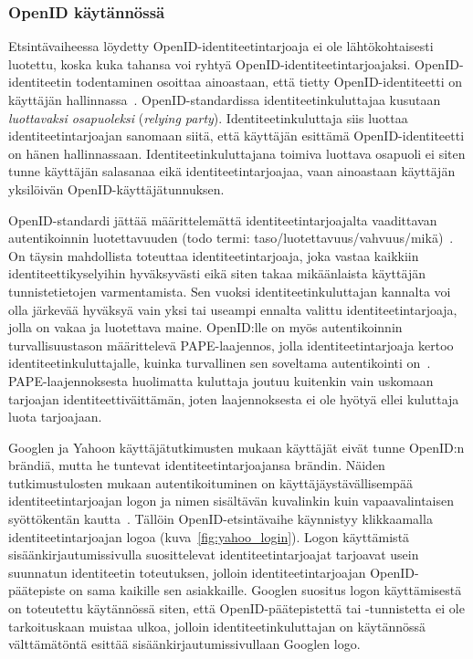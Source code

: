 \documentclass[finnish,gradu]{tktltiki}
\begin{document}
    \subsubsection{OpenID käytännössä} %
    \label{ssub:openid_käytännössä}

    Etsintävaiheessa löydetty OpenID-identiteetintarjoaja ei ole lähtökohtaisesti luotettu, koska kuka tahansa voi ryhtyä OpenID-identiteetintarjoajaksi. OpenID-identiteetin todentaminen osoittaa ainoastaan, että tietty OpenID-identiteetti on käyttäjän hallinnassa~\cite{openid_2.0_specification_07}. OpenID-standardissa identiteetinkuluttajaa kusutaan \emph{luottavaksi osapuoleksi} (\emph{relying party}). Identiteetinkuluttaja siis luottaa identiteetintarjoajan sanomaan siitä, että käyttäjän esittämä OpenID-identiteetti on hänen hallinnassaan. Identiteetinkuluttajana toimiva luottava osapuoli ei siten tunne käyttäjän salasanaa eikä identiteetintarjoajaa, vaan ainoastaan käyttäjän yksilöivän OpenID-käyttäjätunnuksen.

    OpenID-standardi jättää määrittelemättä identiteetintarjoajalta vaadittavan autentikoinnin luotettavuuden (todo termi: taso/luotettavuus/vahvuus/mikä)~\cite{openid_2.0_specification_07}. On täysin mahdollista toteuttaa identiteetintarjoaja, joka vastaa kaikkiin identiteettikyselyihin hyväksyvästi eikä siten takaa mikäänlaista käyttäjän tunnistetietojen varmentamista. Sen vuoksi identiteetinkuluttajan kannalta voi olla järkevää hyväksyä vain yksi tai useampi ennalta valittu identiteetintarjoaja, jolla on vakaa ja luotettava maine. OpenID:lle on myös autentikoinnin turvallisuustason määrittelevä PAPE-laajennos, jolla identiteetintarjoaja kertoo identiteetinkuluttajalle, kuinka turvallinen sen soveltama autentikointi on~\cite{openid_2.0_pape_07}. PAPE-laajennoksesta huolimatta kuluttaja joutuu kuitenkin vain uskomaan tarjoajan identiteettiväittämän, joten laajennoksesta ei ole hyötyä ellei kuluttaja luota tarjoajaan.

    Googlen ja Yahoon käyttäjätutkimusten mukaan käyttäjät eivät tunne OpenID:n brändiä, mutta he tuntevat identiteetintarjoajansa brändin. Näiden tutkimustulosten mukaan autentikoituminen on käyttäjäystävällisempää identiteetintarjoajan logon ja nimen sisältävän kuvalinkin kuin vapaavalintaisen syöttökentän kautta~\cite{google_usability_federated_login_2008, yahoo_usability_openid_2008, google_thoughts_combining_ux_2008}. Tällöin OpenID-etsintävaihe käynnistyy klikkaamalla identiteetintarjoajan logoa (kuva~\ref{fig:yahoo_login}). Logon käyttämistä sisäänkirjautumissivulla suosittelevat identiteetintarjoajat tarjoavat usein suunnatun identiteetin toteutuksen, jolloin identiteetintarjoajan OpenID-päätepiste on sama kaikille sen asiakkaille. Googlen suositus logon käyttämisestä on toteutettu käytännössä siten, että OpenID-päätepistettä tai -tunnistetta ei ole tarkoituskaan muistaa ulkoa, jolloin identiteetinkuluttajan on käytännössä välttämätöntä esittää sisäänkirjautumissivullaan Googlen logo.
\end{document}
